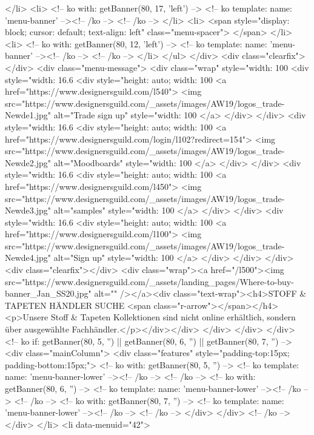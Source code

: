 </li>
<li>
<!-- ko with: getBanner(80, 17, 'left') -->
<!-- ko template: { name: 'menu-banner' } --><!-- /ko -->
<!-- /ko -->
</li>
<li>
<span style="display: block; cursor: default; text-align: left" class="menu-spacer"> </span>
</li>
<li>
<!-- ko with: getBanner(80, 12, 'left') -->
<!-- ko template: { name: 'menu-banner' } --><!-- /ko -->
<!-- /ko -->
</li>
</ul>
</div>
<div class="clearfix"></div>
<div class="menu-message">
<div class="wrap" style="width: 100%
<div style="width: 16.6%
<div style="height: auto; width: 100%
<a href="https://www.designersguild.com/l540">
<img src="https://www.designersguild.com/_assets/images/AW19/logos_trade-Newde1.jpg" alt="Trade sign up" style="width: 100%
</a>
</div>
</div>
<div style="width: 16.6%
<div style="height: auto; width: 100%
<a href="https://www.designersguild.com/login/l102?redirect=154">
<img src="https://www.designersguild.com/_assets/images/AW19/logos_trade-Newde2.jpg" alt="Moodboards" style="width:  100%
</a>
</div>
</div>
<div style="width: 16.6%
<div style="height: auto; width: 100%
<a href="https://www.designersguild.com/l450">
<img src="https://www.designersguild.com/_assets/images/AW19/logos_trade-Newde3.jpg" alt="samples" style="width:  100%
</a>
</div>
</div>
<div style="width: 16.6%
<div style="height: auto; width: 100%
<a href="https://www.designersguild.com/l100">
<img src="https://www.designersguild.com/_assets/images/AW19/logos_trade-Newde4.jpg" alt="Sign up" style="width:  100%
</a>
</div>
</div>
</div>
<div class="clearfix"></div>
<div class="wrap"><a href="/l500"><img src="https://www.designersguild.com/_assets/landing_pages/Where-to-buy-banner_Jan_SS20.jpg" alt="" /></a><div class="text-wrap"><h4>STOFF & TAPETEN HÄNDLER SUCHE <span class="r-arrow"></span></h4><p>Unsere Stoff & Tapeten Kollektionen sind nicht online erhältlich, sondern über ausgewählte Fachhändler.</p></div></div>
</div>
</div>
</div>
<!-- ko if: getBanner(80, 5, '') || getBanner(80, 6, '') || getBanner(80, 7, '') -->
<div class="mainColumn">
<div class="features" style="padding-top:15px; padding-bottom:15px;">
<!-- ko with: getBanner(80, 5, '') -->
<!-- ko template: { name: 'menu-banner-lower' } --><!-- /ko -->
<!-- /ko -->
<!-- ko with: getBanner(80, 6, '') -->
<!-- ko template: { name: 'menu-banner-lower' } --><!-- /ko -->
<!-- /ko -->
<!-- ko with: getBanner(80, 7, '') -->
<!-- ko template: { name: 'menu-banner-lower' } --><!-- /ko -->
<!-- /ko -->
</div>
</div>
<!-- /ko -->
</div>
</li>
<li data-menuid="42">

